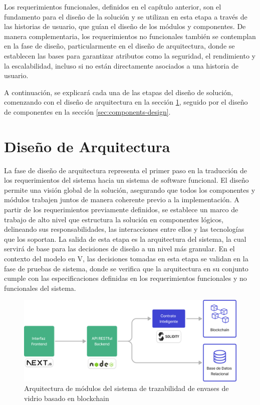Los requerimientos funcionales, definidos en el capítulo anterior, son el fundamento para el diseño de la solución y se utilizan en esta etapa a través de las historias de usuario, que guían el diseño de los módulos y componentes. De manera complementaria, los requerimientos no funcionales también se contemplan en la fase de diseño, particularmente en el diseño de arquitectura, donde se establecen las bases para garantizar atributos como la seguridad, el rendimiento y la escalabilidad, incluso si no están directamente asociados a una historia de usuario.

A continuación, se explicará cada una de las etapas del diseño de solución, comenzando con el diseño de arquitectura en la sección \ref{sec:module-design}, seguido por el diseño de componentes en la sección \ref{sec:components-design}.

\section{Diseño de Arquitectura}
\label{sec:module-design}

La fase de diseño de arquitectura representa el primer paso en la traducción de los requerimientos del sistema hacia un sistema de \gls{software} funcional. El diseño permite una visión global de la solución, asegurando que todos los componentes y módulos trabajen juntos de manera coherente previo a la implementación. A partir de los requerimientos previamente definidos, se establece un marco de trabajo de alto nivel que estructura la solución en componentes lógicos, delineando sus responsabilidades, las interacciones entre ellos y las tecnologías que los soportan. La salida de esta etapa es la arquitectura del sistema, la cual servirá de base para las decisiones de diseño a un nivel más granular. En el contexto del modelo en V, las decisiones tomadas en esta etapa se validan en la fase de pruebas de sistema, donde se verifica que la arquitectura en su conjunto cumple con las especificaciones definidas en los requerimientos funcionales y no funcionales del sistema.

\begin{figure}[!b]
    \centering
    \includegraphics[width=\linewidth]{Figures/software-architecture.png}
    \caption{Arquitectura de módulos del sistema de trazabilidad de envases de vidrio basado en blockchain}
    \label{fig:software-architecture}
\end{figure}


